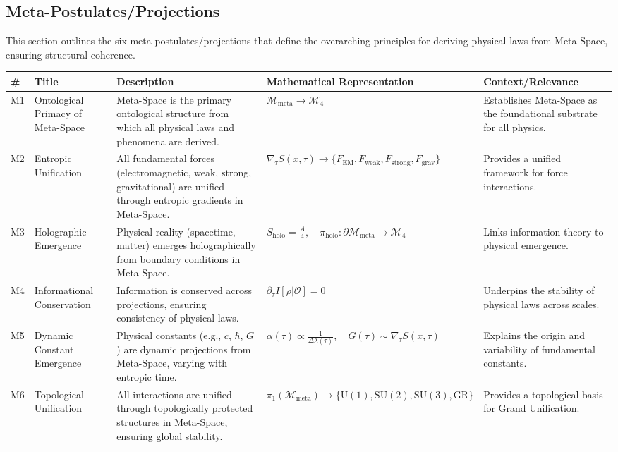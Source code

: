 \documentclass[10.5pt,a4paper]{article}
\begin{document}
\subsection{Meta-Postulates/Projections}
This section outlines the six meta-postulates/projections that define the overarching principles for deriving physical laws from Meta-Space, ensuring structural coherence.

{\small
\begin{longtable}{p{0.5cm} p{2.25cm} p{4.25cm} p{5.75cm} p{3.75cm}}
\hline
\textbf{\#} & \textbf{Title} & \textbf{Description} & \textbf{Mathematical Representation} & \textbf{Context/Relevance} \\
\hline
\endhead

M1 & Ontological Primacy of Meta-Space & Meta-Space is the primary ontological structure from which all physical laws and phenomena are derived. & \( \mathcal{M}_{\mathrm{meta}} \rightarrow \mathcal{M}_4 \) & Establishes Meta-Space as the foundational substrate for all physics. \\

M2 & Entropic Unification & All fundamental forces (electromagnetic, weak, strong, gravitational) are unified through entropic gradients in Meta-Space. & \( \nabla_\tau S(x, \tau) \rightarrow \{ F_{\mathrm{EM}}, F_{\mathrm{weak}}, F_{\mathrm{strong}}, F_{\mathrm{grav}} \} \) & Provides a unified framework for force interactions. \\

M3 & Holographic Emergence & Physical reality (spacetime, matter) emerges holographically from boundary conditions in Meta-Space. & \( S_{\mathrm{holo}} = \frac{A}{4}, \quad \pi_{\mathrm{holo}}: \partial \mathcal{M}_{\mathrm{meta}} \rightarrow \mathcal{M}_4 \) & Links information theory to physical emergence. \\

M4 & Informational Conservation & Information is conserved across projections, ensuring consistency of physical laws. & \( \partial_\tau I[\rho | \mathcal{O}] = 0 \) & Underpins the stability of physical laws across scales. \\

M5 & Dynamic Constant Emergence & Physical constants (e.g., \( c \), \( \hbar \), \( G \)) are dynamic projections from Meta-Space, varying with entropic time. & \( \alpha(\tau) \propto \frac{1}{\Delta \lambda(\tau)}, \quad G(\tau) \sim \nabla_\tau S(x, \tau) \) & Explains the origin and variability of fundamental constants. \\

M6 & Topological Unification & All interactions are unified through topologically protected structures in Meta-Space, ensuring global stability. & \( \pi_1(\mathcal{M}_{\mathrm{meta}}) \rightarrow \{ \mathrm{U}(1), \mathrm{SU}(2), \mathrm{SU}(3), \mathrm{GR} \} \) & Provides a topological basis for Grand Unification. \\
\hline
\end{longtable}
}
\end{document}
